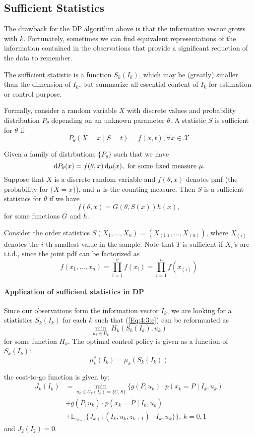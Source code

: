 \begin{itemize}
\section{Sufficient Statistics}
The drawback for the DP algorithm above is that the information vector grows with $k$.
Fortunately, sometimes we can find equivalent representations of the information contained in the observations that provide a significant reduction of the data to remember.
\begin{definition}
The sufficient statistic is a function $S_k(I_k)$, which may be (greatly) smaller than the dimension of $I_k$, but summarize all essential content of $I_k$ for estimation or control purpose.

Formally, consider a random variable $X$ with discrete values and probability distribution $P_{\theta}$ depending on an unknown parameter $\theta$.
A statistic $S$ is sufficient for $\theta$ if
\[
P_{\theta}(X=x\mid S=t)=f(x,t),\forall x\in\mathcal{X}
\]
\end{definition}

\begin{theorem}
Given a family of distrbutions $\{P_{\theta}\}$ such that we have
\[
\,\mathrm{d} P_{\theta}(x)=f(\theta,x)\,\mathrm{d}\mu(x),\ \text{for some fixed measure $\mu$}.
\]
Suppose that $X$ is a discrete random variable and $f(\theta,x)$ denotes pmf (the probability for $\{X=x\}$), and $\mu$ is the counting measure.
Then $S$ is a sufficient statistics for $\theta$ if we have
\[
f(\theta,x)=G(\theta,S(x))h(x),
\]
for some functions $G$ and $h$.
\end{theorem}
\begin{example}
Consider the order statistics $S(X_1,\dots,X_n)=(X_{(1)},\dots,X_{(n)})$,
where $X_{(i)}$ denotes the $i$-th smallest value in the sample.
Note that $T$ is sufficient if $X_i$'s are i.i.d., since the joint pdf can be factorized as
\[
f(x_1,\dots,x_n)=\prod_{i=1}^nf(x_i)=\prod_{i=1}^nf(x_{(i)})
\]
\end{example}
\paragraph{Application of sufficient statistics in DP}
Since our observations form the information vector $I_k$, we are looking for a stiatistics $S_k(I_k)$ for each $k$ such that (\ref{Eq:4:3:c}) can be reformuated as
\[
\min_{u_k\in U_k}
H_k(S_k(I_k),u_k)
\]
for some function $H_k$.
The optimal control policy is given as a function of $S_k(I_k)$:
\[
\mu^*_k(I_k)=\bar{\mu}_k(S_k(I_k))
\]






the cost-to-go function is given by:
\begin{align*}
J_k(I_k)&=\min_{u_k\in U_k(I_k)=\{C,S\}}
\{
g(P,u_k)\cdot p(x_k=P\mid I_k,u_k)\\
&+
g(\bar{P},u_k)\cdot p(x_k=\bar{P}\mid I_k,u_k)\\
&+\mathbb{E}_{z_{k+1}}\{J_{k+1}(I_k,u_k,z_{k+1})\mid I_k,u_k\}
\},\ k=0,1
\end{align*}
and $J_2(I_2)=0$.
\end{itemize}
